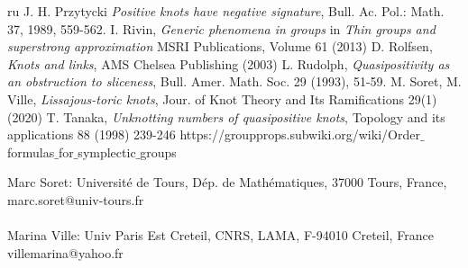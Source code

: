 \documentclass[12pt]{article}
\begin{document}
\begin{thebibliography}{ru}
 				 J. H. Przytycki {\it Positive knots have negative signature}, Bull. Ac. Pol.: Math. 37, 1989, 559-562.
 		 I. Rivin, {\it Generic phenomena in groups} in {\it Thin groups and superstrong approximation} MSRI Publications, Volume 61 (2013) 
 		 D. Rolfsen, {\it Knots and links}, AMS Chelsea Publishing (2003) 
  L. Rudolph, {\it Quasipositivity as an obstruction to sliceness}, Bull. Amer. Math. Soc. 29 (1993), 51-59.
 	 M. Soret, M. Ville, {\it Lissajous-toric knots},  Jour. of Knot Theory and Its Ramifications 29(1) (2020) 
 	 T. Tanaka, {\it Unknotting numbers  of quasipositive knots}, Topology and its applications 88 (1998) 239-246
 	 https://groupprops.subwiki.org/wiki/Order$\_$formulas$\_$for$\_$symplectic$\_$groups
 \end{thebibliography}
\footnotesize{Marc Soret: Universit\'e de Tours, D\'ep. de Math\'ematiques, 37000 Tours, France,\\
	marc.soret@univ-tours.fr\\
	 \\
Marina Ville: Univ Paris Est Creteil, CNRS, LAMA, F-94010 Creteil, France\\	villemarina@yahoo.fr}
\end{document}
